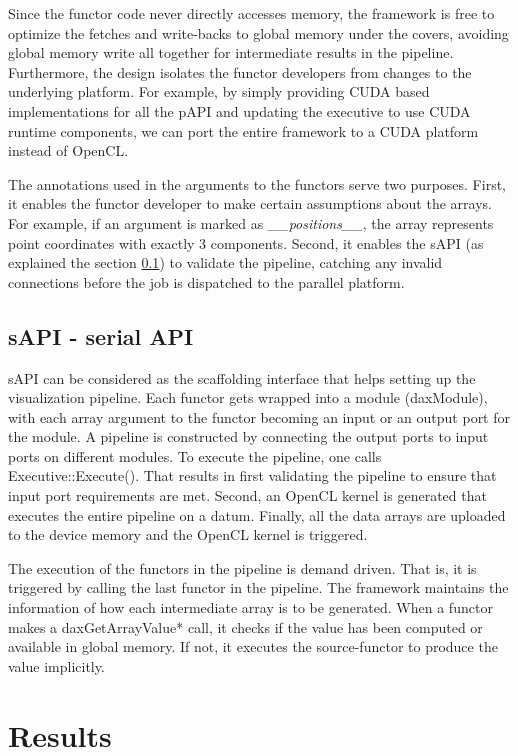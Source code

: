 \documentclass{vgtc}                          %
\begin{document}
Since the functor code never directly accesses memory, the framework is free to
optimize the fetches and write-backs to global memory under the covers, avoiding
global memory write all together for intermediate results in the pipeline.
Furthermore, the design isolates the functor developers from changes to the
underlying platform. For example, by simply providing CUDA based implementations
for all the pAPI and updating the executive to use CUDA runtime components, we
can port the entire framework to a CUDA platform instead of OpenCL.

The annotations used in the arguments to the functors serve two purposes.
First, it enables the functor developer to make certain assumptions about
the arrays. For example, if an argument is marked as \emph{\_\_positions\_\_}, the
array represents point coordinates with exactly 3 components.
Second, it enables the sAPI (as explained the section \ref{sec:sAPI}) to validate
the pipeline, catching any invalid connections before the job is dispatched to
the parallel platform.

\subsection{sAPI - serial API}
\label{sec:sAPI}

sAPI can be considered as the scaffolding interface that helps setting up the
visualization pipeline. Each functor gets wrapped into a module (daxModule),
with each array argument to the functor  becoming an input or an output port for
the module. A pipeline is constructed by connecting the output ports to input
ports on different modules. To execute the pipeline, one calls
Executive::Execute(). That results in first validating the pipeline to ensure
that input port requirements are met. Second, an OpenCL kernel is generated that
executes the entire pipeline on a datum. Finally, all the data arrays are
uploaded to the device memory and the OpenCL kernel is triggered.

The execution of the functors in the pipeline is demand driven. That is, it is
triggered by calling the last functor in the pipeline. The framework maintains
the information of how each intermediate array is to be generated. When a
functor makes a daxGetArrayValue* call, it checks if the value has been computed
or available in global memory. If not, it executes the source-functor to produce
the value implicitly.

\section{Results}
\label{sec:Results}
\end{document}
